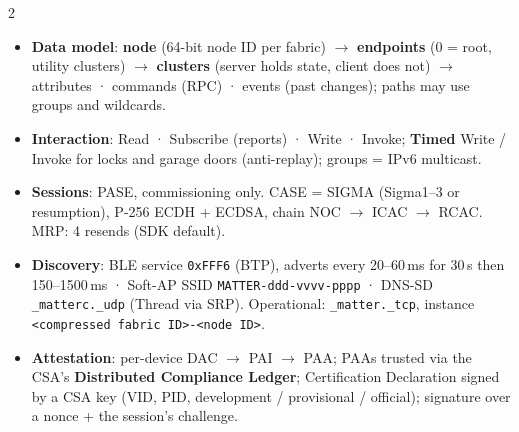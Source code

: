 \documentclass[8pt]{extarticle}
\newcommand\ct[1]{\texttt{#1}}
\newcommand\fld[5]{\node[fd, minimum width=#3cm, fill=#4] at (#1,#2) {#5};}
\begin{document}
\begin{multicols}{2}
\noindent{}
\begin{itemize}
  \item \textbf{Data model}: \textbf{node} (64-bit node ID per fabric) $\to$ \textbf{endpoints} (0 =
        root, utility clusters) $\to$ \textbf{clusters} (server holds state, client does not) $\to$
        attributes · commands (RPC) · events (past changes); paths may use groups and wildcards.
  \item \textbf{Interaction}: Read · Subscribe (reports) · Write · Invoke; \textbf{Timed} Write /
        Invoke for locks and garage doors (anti-replay); groups = IPv6 multicast.
  \item \textbf{Sessions}: PASE, commissioning only. CASE = SIGMA (Sigma1–3 or resumption), P-256
        ECDH + ECDSA, chain NOC $\to$ ICAC $\to$ RCAC. MRP: 4 resends (SDK default).
  \item \textbf{Discovery}: BLE service \ct{0xFFF6} (BTP), adverts every 20–60\,ms for 30\,s then
        150–1500\,ms · Soft-AP SSID \ct{MATTER-ddd-vvvv-pppp} · DNS-SD \ct{\_matterc.\_udp} (Thread
        via SRP). Operational: \ct{\_matter.\_tcp}, instance \ct{<compressed fabric ID>-<node ID>}.
  \item \textbf{Attestation}: per-device DAC $\to$ PAI $\to$ PAA; PAAs trusted via the CSA's
        \textbf{Distributed Compliance Ledger}; Certification Declaration signed by a CSA key (VID,
        PID, development / provisional / official); signature over a nonce + the session's challenge.

\end{itemize}
\end{multicols}
\end{document}
